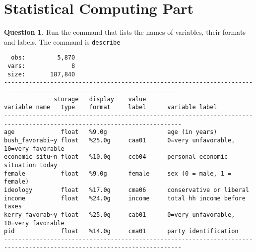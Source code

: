 \documentclass[12pt]{article}
\begin{document}
\section{Statistical Computing Part} 
\textbf{Question 1.} \hspace{3mm} Run the command that lists the names of variables, their formats and labels.
\vspace{4mm} 
The command is \verb|describe|
\begin{verbatim}
  obs:         5,870                          
 vars:             8                          
 size:       187,840                          
------------------------------------------------------------------------------------------------------------------------
              storage   display    value
variable name   type    format     label      variable label
------------------------------------------------------------------------------------------------------------------------
age             float   %9.0g                 age (in years)
bush_favorabi~y float   %25.0g     caa01      0=very unfavorable, 10=very favorable
economic_situ~n float   %10.0g     ccb04      personal economic situation today
female          float   %9.0g      female     sex (0 = male, 1 = female)
ideology        float   %17.0g     cma06      conservative or liberal
income          float   %24.0g     income     total hh income before taxes
kerry_favorab~y float   %25.0g     cab01      0=very unfavorable, 10=very favorable
pid             float   %14.0g     cma01      party identification
------------------------------------------------------------------------------------------------------------------------ 

\end{verbatim}
\end{document}
